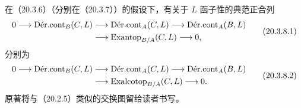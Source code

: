在（20.3.6）（分别在（20.3.7））的假设下，有关于 $L$ 函子性的典范正合列
\begin{equation}
\begin{aligned}
0\longrightarrow\DerCont_B(C,L)&\longrightarrow\DerCont_A(C,L)
\longrightarrow\DerCont_A(B,L)\\
&\longrightarrow\Exantop_{B/A}(C,L)\longrightarrow0,
\end{aligned}
\tag{20.3.8.1}
\end{equation}
分别为
\begin{equation}
\begin{aligned}
0\longrightarrow\DerCont_B(C,L)&\longrightarrow\DerCont_A(C,L)
\longrightarrow\DerCont_A(B,L)\\
&\longrightarrow\Exalcotop_{B/A}(C,L)\longrightarrow0.
\end{aligned}
\tag{20.3.8.2}
\end{equation}
原著将与（20.2.5）类似的交换图留给读者书写。

